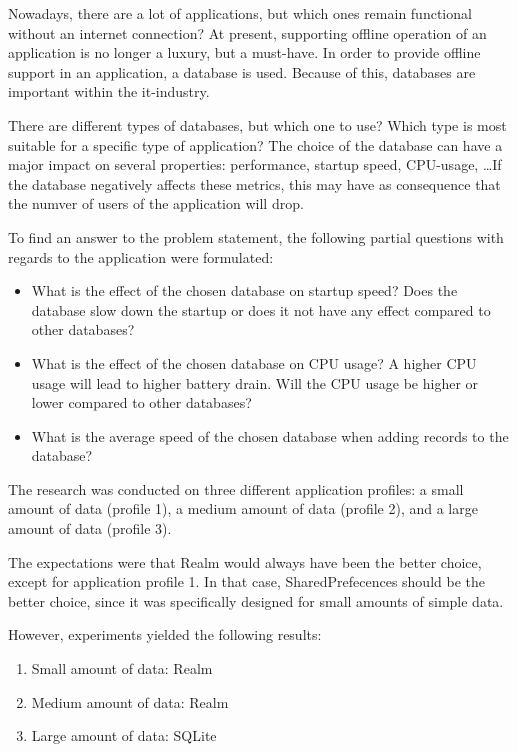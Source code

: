 \begin{displayquote}
  Nowadays, there are a lot of applications, but which ones remain functional without an internet connection? At present, supporting offline operation of an application is no longer a luxury, but a must-have. In order to provide offline support in an application, a database is used. Because of this, databases are important within the it-industry.
  
  There are different types of databases, but which one to use? Which type is most suitable for a specific type of application? The choice of the database can have a major impact on several properties: performance, startup speed, CPU-usage, \ldots If the database negatively affects these metrics, this may have as consequence that the numver of users of the application will drop.
  
  To find an answer to the problem statement, the following partial questions with regards to the application were formulated:
  
  \begin{itemize}
    \item What is the effect of the chosen database on startup speed? Does the database slow down the startup or does it not have any effect compared to other databases?
    \item What is the effect of the chosen database on CPU usage? A higher CPU usage will lead to higher battery drain. Will the CPU usage be higher or lower compared to other databases?
    \item What is the average speed of the chosen database when adding records to the database?
  \end{itemize}
  
  The research was conducted on three different application profiles: a small amount of data (profile 1), a medium amount of data (profile 2), and a large amount of data (profile 3).
  
  The expectations were that Realm would always have been the better choice, except for application profile 1. In that case, SharedPrefecences should be the better choice, since it was specifically designed for small amounts of simple data.
  
  However, experiments yielded the following results:
  
  \begin{enumerate}
    \item Small amount of data: Realm
    \item Medium amount of data: Realm
    \item Large amount of data: SQLite
  \end{enumerate}

\end{displayquote}

